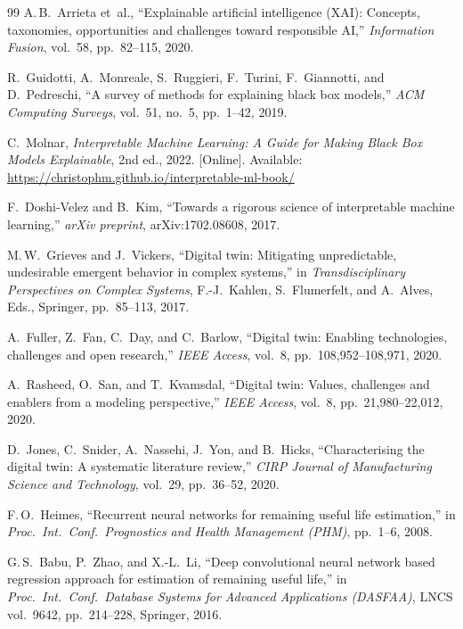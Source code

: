 \documentclass[10pt, journal, letterpaper]{IEEEtran}
\begin{document}
\begin{thebibliography}{99}
A.\,B.~Arrieta et~al.,
``Explainable artificial intelligence (XAI): Concepts, taxonomies,
opportunities and challenges toward responsible AI,''
\emph{Information Fusion}, vol.~58, pp.~82--115, 2020.

R.~Guidotti, A.~Monreale, S.~Ruggieri, F.~Turini, F.~Giannotti,
and D.~Pedreschi,
``A survey of methods for explaining black box models,''
\emph{ACM Computing Surveys}, vol.~51, no.~5, pp.~1--42, 2019.

C.~Molnar,
\emph{Interpretable Machine Learning: A Guide for Making Black Box Models
Explainable}, 2nd ed., 2022.
[Online]. Available: \url{https://christophm.github.io/interpretable-ml-book/}

F.~Doshi-Velez and B.~Kim,
``Towards a rigorous science of interpretable machine learning,''
\emph{arXiv preprint}, arXiv:1702.08608, 2017.

M.\,W.~Grieves and J.~Vickers,
``Digital twin: Mitigating unpredictable, undesirable emergent behavior in
complex systems,''
in \emph{Transdisciplinary Perspectives on Complex Systems}, F.-J.~Kahlen,
S.~Flumerfelt, and A.~Alves, Eds., Springer, pp.~85--113, 2017.

A.~Fuller, Z.~Fan, C.~Day, and C.~Barlow,
``Digital twin: Enabling technologies, challenges and open research,''
\emph{IEEE Access}, vol.~8, pp.~108,952--108,971, 2020.

A.~Rasheed, O.~San, and T.~Kvamsdal,
``Digital twin: Values, challenges and enablers from a modeling perspective,''
\emph{IEEE Access}, vol.~8, pp.~21,980--22,012, 2020.

D.~Jones, C.~Snider, A.~Nassehi, J.~Yon, and B.~Hicks,
``Characterising the digital twin: A systematic literature review,''
\emph{CIRP Journal of Manufacturing Science and Technology},
vol.~29, pp.~36--52, 2020.

F.\,O.~Heimes,
``Recurrent neural networks for remaining useful life estimation,''
in \emph{Proc.\ Int.\ Conf.\ Prognostics and Health Management (PHM)},
pp.~1--6, 2008.

G.\,S.~Babu, P.~Zhao, and X.-L.~Li,
``Deep convolutional neural network based regression approach for estimation
of remaining useful life,''
in \emph{Proc.\ Int.\ Conf.\ Database Systems for Advanced Applications
(DASFAA)}, LNCS vol.~9642, pp.~214--228, Springer, 2016.


\end{thebibliography}
\end{document}

